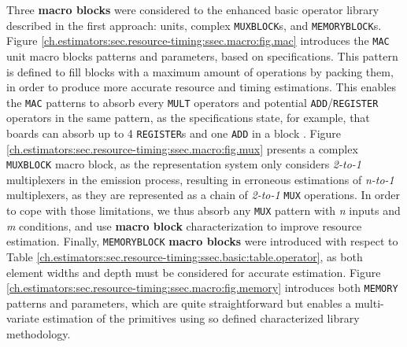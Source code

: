         Three {\bf macro blocks} were considered to the enhanced basic operator library described in the first approach:  units, complex {\tt MUXBLOCK}s, and {\tt MEMORYBLOCK}s.
        Figure \ref{ch.estimators:sec.resource-timing:ssec.macro:fig.mac} introduces the {\tt MAC} unit macro blocks patterns and parameters, based on \Xilinx{} \VC{} specifications.
        This pattern is defined to fill  blocks with a maximum amount of \firrtl{} operations by packing them, in order to produce more accurate resource and timing estimations.
        This enables the {\tt MAC} patterns to absorb every {\tt MULT} operators and potential {\tt ADD}/{\tt REGISTER} operators in the same pattern, as the specifications state, for example, that \Xilinx{} \Virtex{} boards can absorb up to 4 {\tt REGISTER}s and one {\tt ADD} in a  block \cite{xilinx_dsp_2018}.
        Figure \ref{ch.estimators:sec.resource-timing:ssec.macro:fig.mux} presents a complex {\tt MUXBLOCK} macro block, as the \firrtl{} representation system only considers {\it 2-to-1} multiplexers in the emission process, resulting in erroneous estimations of {\it n-to-1} multiplexers, as they are represented as a chain of {\it 2-to-1} {\tt MUX} operations.
        In order to cope with those limitations, we thus absorb any {\tt MUX} pattern with {\it n} inputs and {\it m} conditions, and use {\bf macro block} characterization to improve resource estimation.
        Finally, {\tt MEMORYBLOCK} {\bf macro blocks} were introduced with respect to Table \ref{ch.estimators:sec.resource-timing:ssec.basic:table.operator}, as both element widths and depth must be considered for accurate estimation. 
        Figure \ref{ch.estimators:sec.resource-timing:ssec.macro:fig.memory} introduces both {\tt MEMORY} patterns and parameters, which are quite straightforward but enables a multi-variate estimation of the primitives using so defined characterized library methodology.

